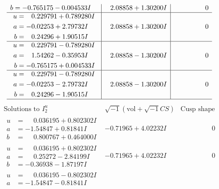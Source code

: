 \documentclass[1p]{elsarticle_modified}
\theoremstyle{definition}
\newcommand{\I}{\sqrt{-1}}
\begin{document}
$$\begin{array}{c|c|c}
\begin{aligned}
b &= -0.765175 - 0.004533 I\end{aligned}
 & \phantom{-}2.08858 + 1.30200 I & \phantom{-0.000000 } 0 \\ \hline\begin{aligned}
u &= \phantom{-}0.229791 + 0.789280 I \\
a &= -0.02253 + 2.79732 I \\
b &= \phantom{-}0.24296 + 1.90515 I\end{aligned}
 & \phantom{-}2.08858 + 1.30200 I & \phantom{-0.000000 } 0 \\ \hline\begin{aligned}
u &= \phantom{-}0.229791 - 0.789280 I \\
a &= \phantom{-}1.54262 - 0.35953 I \\
b &= -0.765175 + 0.004533 I\end{aligned}
 & \phantom{-}2.08858 - 1.30200 I & \phantom{-0.000000 } 0 \\ \hline\begin{aligned}
u &= \phantom{-}0.229791 - 0.789280 I \\
a &= -0.02253 - 2.79732 I \\
b &= \phantom{-}0.24296 - 1.90515 I\end{aligned}
 & \phantom{-}2.08858 - 1.30200 I & \phantom{-0.000000 } 0\\
 \hline 
 \end{array}$$\newpage$$\begin{array}{c|c|c}  
\text{Solutions to }I^u_{2}& \I (\text{vol} + \sqrt{-1}CS) & \text{Cusp shape}\\
 \hline 
\begin{aligned}
u &= \phantom{-}0.036195 + 0.802302 I \\
a &= -1.54847 + 0.81841 I \\
b &= \phantom{-}0.800767 + 0.464000 I\end{aligned}
 & -0.71965 + 4.02232 I & \phantom{-0.000000 } 0 \\ \hline\begin{aligned}
u &= \phantom{-}0.036195 + 0.802302 I \\
a &= \phantom{-}0.25272 - 2.84199 I \\
b &= -0.36938 - 1.87197 I\end{aligned}
 & -0.71965 + 4.02232 I & \phantom{-0.000000 } 0 \\ \hline\begin{aligned}
u &= \phantom{-}0.036195 - 0.802302 I \\
a &= -1.54847 - 0.81841 I \\

\end{aligned}
\end{array}$$
\end{document}
